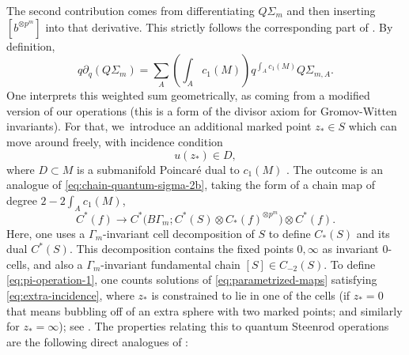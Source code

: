 \documentclass[JEP,XML,SOM,Unicode,NoFloatCountersInSection,published]{cedram}
\theoremstyle{plain}
\theoremstyle{definition}
\begin{document}
The second contribution comes from differentiating $Q\Sigma_m$ and then inserting $[b^{\otimes p^m}]$ into that derivative. This strictly follows the corresponding part of \cite{seidel-wilkins21}. By definition,
\begin{equation*}
q\partial_q (Q\Sigma_m) = \sum_A ({\textstyle \int_A c_1(M)}) q^{\int_A c_1(M)} Q\Sigma_{m,A}.
\end{equation*}
One interprets this weighted sum geometrically, as coming from a modified version of our operations (this is a form of the divisor axiom for Gromov-Witten invariants). For that, we~introduce an additional marked point $z_* \in S$ which can move around freely, with incidence condition
\begin{equation}\label{eq:extra-incidence}
u(z_*) \in D,
\end{equation}
where $D \subset M$ is a submanifold Poincaré dual to $c_1(M)$ . The outcome is an analogue of \eqref{eq:chain-quantum-sigma-2b}, taking the form of a chain map of degree $2-2\int_A c_1(M)$,
\begin{equation}\label{eq:pi-operation-1}
C^*(f) \to C^*\bigl(B\Gamma_m;C^*(S) \otimes C_*(f)^{\otimes p^m}\bigr) \otimes C^*(f).
\end{equation}
Here, one uses a $\Gamma_m$-invariant cell decomposition of $S$ \cite[\S 2c]{seidel-wilkins21} to define $C_*(S)$ and its dual $C^*(S)$. This decomposition contains the fixed points $0,\infty$ as invariant $0$-cells, and also a $\Gamma_m$-invariant fundamental chain $[S] \in C_{-2}(S)$. To define \eqref{eq:pi-operation-1}, one counts solutions of \eqref{eq:parametrized-maps} satisfying \eqref{eq:extra-incidence}, where $z_*$ is constrained to lie in one of the cells (if $z_* = 0$ that means bubbling off of an extra sphere with two marked points; and similarly for $z_* = \infty$); see \cite[\S\S 4c \& 5a]{seidel-wilkins21}. The properties relating this to quantum Steenrod operations are the following direct analogues of \cite[Lem.\,5.2--Lem.\,5.4]{seidel-wilkins21}:
\end{document}
